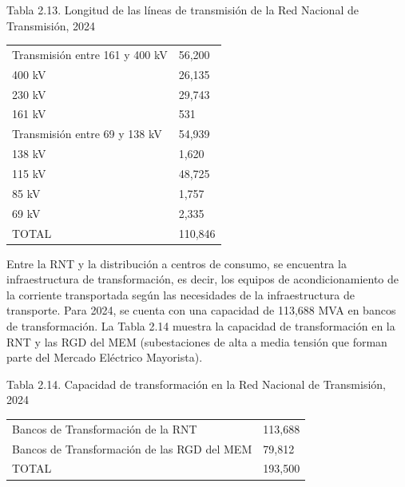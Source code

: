 \documentclass{sener2025}
\begin{document}
\begin{tabladoradoCorto}
  \caption{Tabla 2.13. Longitud de las líneas de transmisión de la  Red Nacional de Transmisión, 2024}
  \label{tab:tabla_2_13__longitud_de_las_li}
  \begin{tabularx}{\textwidth}{Vv}
    \toprule
      &  \\
    \midrule
    Transmisión entre 161 y 400 kV & 56,200 \\
    400 kV & 26,135 \\
    230 kV & 29,743 \\
    161 kV & 531 \\
    Transmisión entre 69 y 138 kV & 54,939 \\
    138 kV & 1,620 \\
    115 kV & 48,725 \\
    85 kV & 1,757 \\
    69 kV & 2,335 \\
    TOTAL & 110,846 \\
    \bottomrule
  \end{tabularx}
\end{tabladoradoCorto}
\vspace{-4pt}


Entre la RNT y la distribución a centros de consumo, se encuentra la infraestructura de transformación, es decir, los equipos de acondicionamiento de la corriente transportada según las necesidades de la infraestructura de transporte. Para 2024, se cuenta con una capacidad de 113,688 MVA en bancos de transformación. La Tabla 2.14 muestra la capacidad de transformación en la RNT y las RGD del MEM (subestaciones de alta a media tensión que forman parte del Mercado Eléctrico Mayorista).

\begin{tabladoradoCorto}
  \caption{Tabla 2.14. Capacidad de transformación en la  Red Nacional de Transmisión, 2024}
  \label{tab:tabla_2_14__capacidad_de_trans}
  \begin{tabularx}{\textwidth}{Vv}
    \toprule
      &  \\
    \midrule
    Bancos de Transformación de la RNT & 113,688 \\
    Bancos de Transformación de las RGD del MEM & 79,812 \\
    TOTAL & 193,500 \\
    \bottomrule
  \end{tabularx}
\end{tabladoradoCorto}
\vspace{-4pt}
\end{document}
